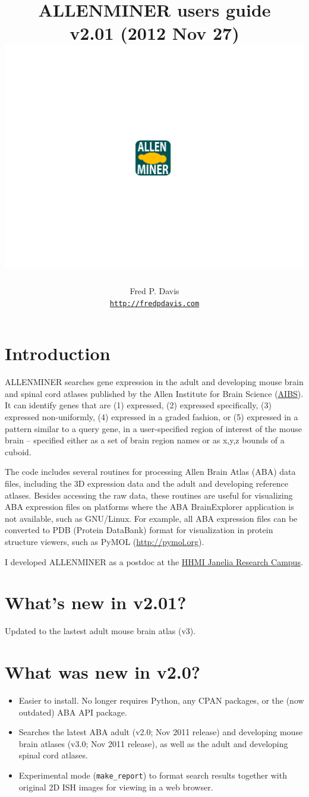 \documentclass[10pt]{article}
\title{ALLENMINER users guide\\v2.01 (2012 Nov 27)\\
\includegraphics[bb=279 200 355 276,scale=0.6]{allenminer_logo.pdf}}
\author{Fred P. Davis\\{\tt \href{http://fredpdavis.com}{http://fredpdavis.com}}}
\begin{document}
\maketitle

\section*{Introduction}
ALLENMINER searches gene expression in the adult and developing mouse brain and spinal cord atlases published by the Allen Institute for Brain Science (\href{http://www.alleninstitute.org}{AIBS}). It can identify genes that are (1) expressed, (2) expressed specifically, (3) expressed non-uniformly, (4) expressed in a graded fashion, or (5) expressed in a pattern similar to a query gene, in a user-specified region of interest of the mouse brain -- specified either as a set of brain region names or as x,y,z bounds of a cuboid.

The code includes several routines for processing Allen Brain Atlas (ABA) data files, including the 3D expression data and the adult and developing reference atlases. Besides accessing the raw data, these routines are useful for visualizing ABA expression files on platforms where the ABA BrainExplorer application is not available, such as GNU/Linux. For example, all ABA expression files can be converted to PDB (Protein DataBank) format for visualization in protein structure viewers, such as PyMOL (\url{http://pymol.org}).

I developed ALLENMINER as a postdoc at the \href{http://janelia.org}{HHMI Janelia Research Campus}.

\section*{What's new in v2.01?}
Updated to the lastest adult mouse brain atlas (v3).

\section*{What was new in v2.0?}
\begin{itemize}\itemsep0pt
\item Easier to install. No longer requires Python, any CPAN packages, or the (now outdated) ABA API package.

\item Searches the latest ABA adult (v2.0; Nov 2011 release) and developing mouse brain atlases (v3.0; Nov 2011 release), as well as the adult and developing spinal cord atlases.

\item Experimental mode ({\tt make\_report}) to format search results together with original 2D ISH images for viewing in a web browser.

\end{itemize}
\end{document}
